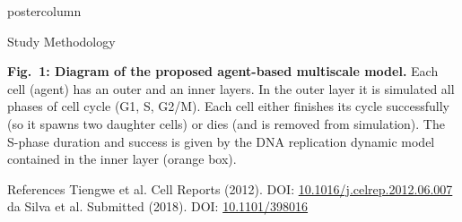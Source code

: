 \documentclass[final,hyperref={pdfpagelabels=false}]{beamer}
\begin{document}
\begin{frame}
\begin{columns}
\begin{column}{.497\textwidth}
\begin{beamercolorbox}[center,wd=\textwidth]{postercolumn}
\begin{minipage}[T]{.95\textwidth}
{\begin{block}{\protect Study Methodology}
\parbox[t][]{0.95\textwidth}
{
\begin{figure}
    \centering
    \label{fig:model}
\end{figure}
{\bf Fig.~1: Diagram of the proposed agent-based multiscale model.} Each cell (agent) has an outer and an inner layers. In the outer layer it is simulated all phases of cell cycle (G1, S, G2/M). Each cell either finishes its cycle successfully (so it spawns two daughter cells) or dies (and is removed from simulation). The S-phase duration and success is given by the DNA replication dynamic model contained in the inner layer (orange box). 
}
\end{block}

      \begin{block}{References}
	\scriptsize
      \smallskip
        [1] Tiengwe et al. Cell Reports (2012). DOI: \href{https://doi.org/10.1016/j.celrep.2012.06.007}{10.1016/j.celrep.2012.06.007}\\
        \bigskip
        [2] da Silva et al. Submitted (2018). DOI: \href{https://doi.org/10.1101/398016 }{10.1101/398016 }\\
\end{block}

}
\end{minipage}
\end{beamercolorbox}
\end{column}
\end{columns}
\end{frame}
\end{document}
